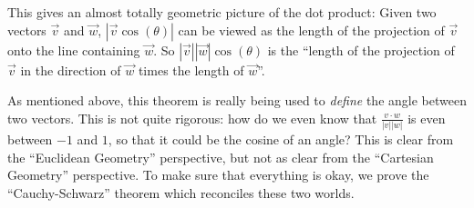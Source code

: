 \documentclass{ximera}
\begin{document}
This gives an almost totally geometric picture of the dot product:
Given two vectors $\vec{v}$ and $\vec{w}$, $|\vec{v}\cos(\theta)|$ can
be viewed as the length of the projection of $\vec{v}$ onto the line
containing $\vec{w}$.  So $|\vec{v}||\vec{w}|\cos(\theta)$ is the
``length of the projection of $\vec{v}$ in the direction of $\vec{w}$
times the length of $\vec{w}$''.
 
 
As mentioned above, this theorem is really being used to
\textit{define} the angle between two vectors.  This is not quite
rigorous: how do we even know that $\frac{v \cdot w}{|v||w|}$ is even
between $-1$ and $1$, so that it could be the cosine of an angle?
This is clear from the ``Euclidean Geometry'' perspective, but not as
clear from the ``Cartesian Geometry'' perspective.  To make sure that
everything is okay, we prove the ``Cauchy-Schwarz'' theorem which
reconciles these two worlds.
 
\end{document}
